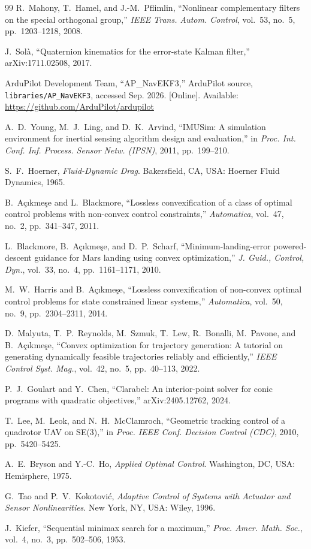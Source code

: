 \documentclass[journal]{IEEEtran}
\begin{document}
\begin{thebibliography}{99}
R.~Mahony, T.~Hamel, and J.-M.~Pflimlin, ``Nonlinear complementary filters on the special orthogonal group,'' \textit{IEEE Trans. Autom. Control}, vol.~53, no.~5, pp.~1203--1218, 2008.

J.~Sol\`a, ``Quaternion kinematics for the error-state Kalman filter,'' arXiv:1711.02508, 2017.

ArduPilot Development Team, ``AP\_NavEKF3,'' ArduPilot source, \texttt{libraries/AP\_NavEKF3}, accessed Sep. 2026. [Online]. Available: \url{https://github.com/ArduPilot/ardupilot}

A.~D.~Young, M.~J.~Ling, and D.~K.~Arvind, ``IMUSim: A simulation environment for inertial sensing algorithm design and evaluation,'' in \textit{Proc. Int. Conf. Inf. Process. Sensor Netw. (IPSN)}, 2011, pp.~199--210.

S.~F.~Hoerner, \textit{Fluid-Dynamic Drag}. Bakersfield, CA, USA: Hoerner Fluid Dynamics, 1965.

B.~A\c{c}{\i}kme\c{s}e and L.~Blackmore, ``Lossless convexification of a class of optimal control problems with non-convex control constraints,'' \textit{Automatica}, vol.~47, no.~2, pp.~341--347, 2011.

L.~Blackmore, B.~A\c{c}{\i}kme\c{s}e, and D.~P.~Scharf, ``Minimum-landing-error powered-descent guidance for Mars landing using convex optimization,'' \textit{J. Guid., Control, Dyn.}, vol.~33, no.~4, pp.~1161--1171, 2010.

M.~W.~Harris and B.~A\c{c}{\i}kme\c{s}e, ``Lossless convexification of non-convex optimal control problems for state constrained linear systems,'' \textit{Automatica}, vol.~50, no.~9, pp.~2304--2311, 2014.

D.~Malyuta, T.~P.~Reynolds, M.~Szmuk, T.~Lew, R.~Bonalli, M.~Pavone, and B.~A\c{c}{\i}kme\c{s}e, ``Convex optimization for trajectory generation: A tutorial on generating dynamically feasible trajectories reliably and efficiently,'' \textit{IEEE Control Syst. Mag.}, vol.~42, no.~5, pp.~40--113, 2022.

P.~J.~Goulart and Y.~Chen, ``Clarabel: An interior-point solver for conic programs with quadratic objectives,'' arXiv:2405.12762, 2024.

T.~Lee, M.~Leok, and N.~H.~McClamroch, ``Geometric tracking control of a quadrotor UAV on SE(3),'' in \textit{Proc. IEEE Conf. Decision Control (CDC)}, 2010, pp.~5420--5425.

A.~E.~Bryson and Y.-C.~Ho, \textit{Applied Optimal Control}. Washington, DC, USA: Hemisphere, 1975.

G.~Tao and P.~V.~Kokotovi\'c, \textit{Adaptive Control of Systems with Actuator and Sensor Nonlinearities}. New York, NY, USA: Wiley, 1996.

J.~Kiefer, ``Sequential minimax search for a maximum,'' \textit{Proc. Amer. Math. Soc.}, vol.~4, no.~3, pp.~502--506, 1953.

\end{thebibliography}
\end{document}
